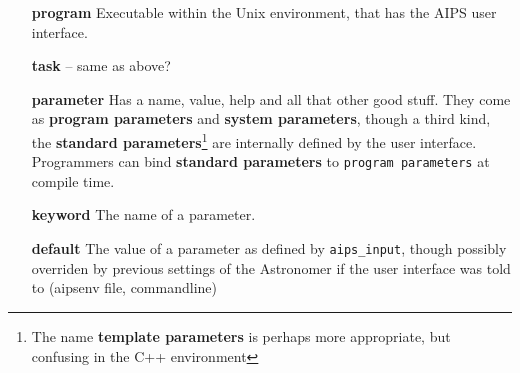\begin{itemize}

\item[{\bf program}]
Executable within the Unix environment, that has
the AIPS user interface.

\item[{\bf task}]
-- same as above?

\item[{\bf parameter}]
Has a name, value, help and all that other good stuff. They come
as {\bf program parameters} and {\bf system parameters}, though
a third kind, the {\bf standard parameters}\footnote{The name
{\bf template parameters} is perhaps more appropriate, but 
confusing in the C++ environment} are internally defined by
the user interface. Programmers can bind {\bf standard
parameters} to {\tt program parameters} at compile time.

\item[{\bf keyword}]
The name of a parameter.

\item[{\bf default}]
The value of a parameter as defined by {\tt aips\_input},
though possibly overriden by previous settings of the
Astronomer if the user interface was told to
(aipsenv file, commandline)

\end{itemize}


